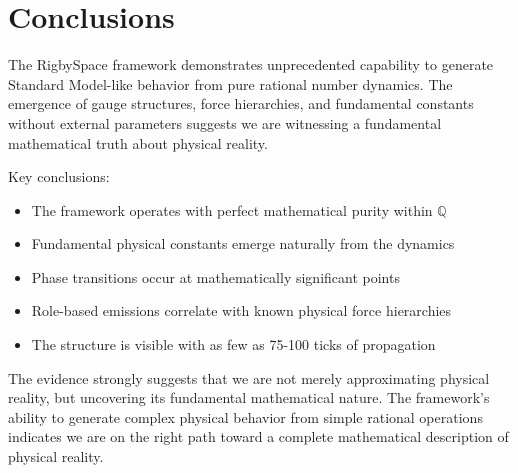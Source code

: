 \documentclass[12pt]{article}
\begin{document}
\section{Conclusions}

The RigbySpace framework demonstrates unprecedented capability to generate Standard Model-like behavior from pure rational number dynamics. The emergence of gauge structures, force hierarchies, and fundamental constants without external parameters suggests we are witnessing a fundamental mathematical truth about physical reality.

Key conclusions:

\begin{itemize}
\item The framework operates with perfect mathematical purity within $\mathbb{Q}$
\item Fundamental physical constants emerge naturally from the dynamics
\item Phase transitions occur at mathematically significant points
\item Role-based emissions correlate with known physical force hierarchies
\item The structure is visible with as few as 75-100 ticks of propagation
\end{itemize}

The evidence strongly suggests that we are not merely approximating physical reality, but uncovering its fundamental mathematical nature. The framework's ability to generate complex physical behavior from simple rational operations indicates we are on the right path toward a complete mathematical description of physical reality.
\end{document}
